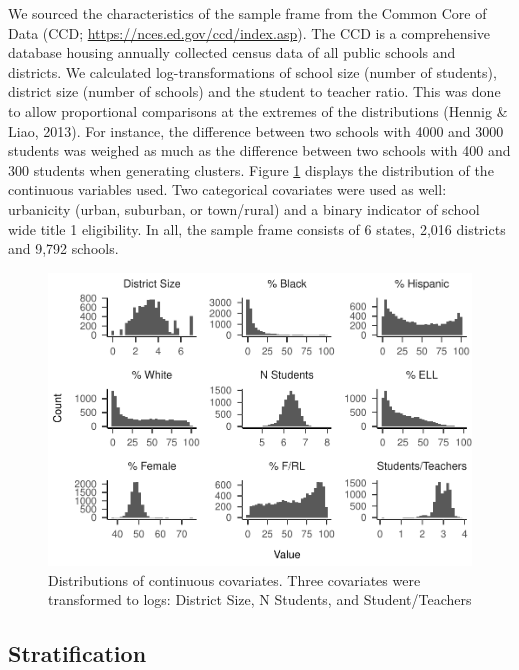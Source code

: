 \documentclass[man,floatsintext]{apa6}
\begin{document}
We sourced the characteristics of the sample frame from the Common Core of Data (CCD; \url{https://nces.ed.gov/ccd/index.asp}). The CCD is a comprehensive database housing annually collected census data of all public schools and districts. We calculated log-transformations of school size (number of students), district size (number of schools) and the student to teacher ratio. This was done to allow proportional comparisons at the extremes of the distributions (Hennig \& Liao, 2013). For instance, the difference between two schools with 4000 and 3000 students was weighed as much as the difference between two schools with 400 and 300 students when generating clusters. Figure \ref{fig:plot-dist1} displays the distribution of the continuous variables used. Two categorical covariates were used as well: urbanicity (urban, suburban, or town/rural) and a binary indicator of school wide title 1 eligibility. In all, the sample frame consists of 6 states, 2,016 districts and 9,792 schools.



\begin{figure}
\centering
\includegraphics{GenSamp-Paper_files/figure-latex/plot-dist1-1.pdf}
\caption{\label{fig:plot-dist1}Distributions of continuous covariates. Three covariates were transformed to logs: District Size, N Students, and Student/Teachers}
\end{figure}

\hypertarget{stratification}{%
\subsection{Stratification}\label{stratification}}
\end{document}
